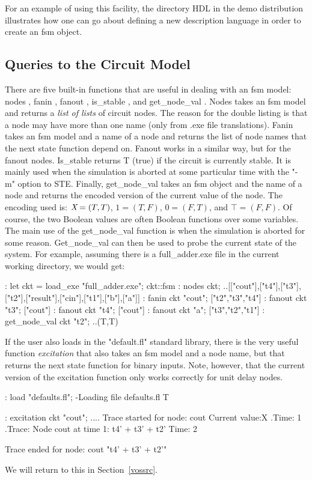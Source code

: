 For an example of using this facility, the directory HDL in the demo
distribution illustrates how one can go about defining a new description
language in order to create an fsm object.

\subsection{Queries to the Circuit Model}

There are five built-in functions that are useful in dealing with
an fsm model: nodes%
%
{}, fanin%
%
{}, fanout%
%
{}, is\_stable%
%
{}, and get\_node\_val%
%
{}.
Nodes takes an fsm model and returns a {\em list of lists} of circuit nodes.
The reason for the double listing is that a node may have more than
one name (only from .exe file translations).
Fanin takes an fsm model and a name of a node and returns the
list of node names that the next state function depend on.
Fanout works in a similar way, but for the fanout nodes.
Is\_stable returns T (true) if the circuit is currently stable.
It is mainly used when the simulation is aborted at some
particular time with the "-m" option to STE.
Finally, get\_node\_val takes an fsm object and the name of a node
and returns the encoded version of the current value of the node.
The encoding used is: $\mbox{\em X} = (T,T)$, $1=(T,F)$, $0=(F,T)$, and $\top=(F,F)$.
Of course, the two Boolean values are often Boolean functions over some
variables.
The main use of the get\_node\_val function is when the simulation
is aborted for some reason.
Get\_node\_val can then be used to probe the current state of the system.
For example, assuming there is a full\_adder.exe file in the current
working directory, we would get:
\begin{hol}
: let ckt = load\_exe "full\_adder.exe";
ckt::fsm
: nodes ckt;
..[["cout"],["t4"],["t3"],["t2"],["result"],["cin"],["t1"],["b"],["a"]]
: fanin ckt "cout";
["t2","t3","t4"]
: fanout ckt "t3";
["cout"]
: fanout ckt "t4";
["cout"]
: fanout ckt "a";
["t3","t2","t1"]
: get\_node\_val ckt "t2";
..(T,T)
\end{hol}

If the user also loads in the "default.fl" standard library, there is
the very useful function {\em excitation}%
that also takes an fsm model
and a node name, but that returns the next state function for binary inputs.
Note, however, that the current version of the excitation function
only works correctly for unit delay nodes.
\begin{hol}
: load "defaults.fl";
-Loading file defaults.fl
T

: excitation ckt "cout";
....
Trace started for node: cout 
        Current value:X
.Time: 1
.Trace: Node cout  at time 1: t4' + t3' + t2'
Time: 2

Trace ended for node: cout 
"t4' + t3' + t2'"
\end{hol}
We will return to this in Section~\ref{vossrc}.

